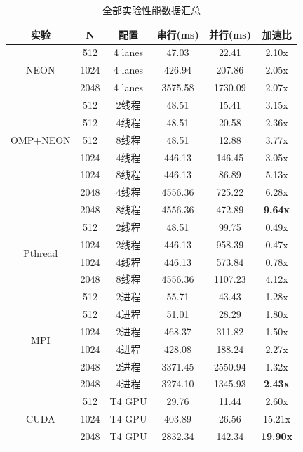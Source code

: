 \documentclass[a4paper]{article}
\begin{document}
\begin{table}[H]
  \centering
  \caption{全部实验性能数据汇总}
  \label{table:allperf}
  \small
  \begin{tabular}{|c|c|c|c|c|c|}
  \hline
  \textbf{实验} & \textbf{N} & \textbf{配置} & \textbf{串行(ms)} & \textbf{并行(ms)} & \textbf{加速比} \\
  \hline
  \multirow{3}{*}{NEON} & 512 & 4 lanes & 47.03 & 22.41 & 2.10x \\
   & 1024 & 4 lanes & 426.94 & 207.86 & 2.05x \\
   & 2048 & 4 lanes & 3575.58 & 1730.09 & 2.07x \\
  \hline
  \multirow{5}{*}{OMP+NEON} & 512 & 2线程 & 48.51 & 15.41 & 3.15x \\
   & 512 & 4线程 & 48.51 & 20.58 & 2.36x \\
   & 512 & 8线程 & 48.51 & 12.88 & 3.77x \\
   & 1024 & 4线程 & 446.13 & 146.45 & 3.05x \\
   & 1024 & 8线程 & 446.13 & 86.89 & 5.13x \\
   & 2048 & 4线程 & 4556.36 & 725.22 & 6.28x \\
   & 2048 & 8线程 & 4556.36 & 472.89 & \textbf{9.64x} \\
  \hline
  \multirow{4}{*}{Pthread} & 512 & 2线程 & 48.51 & 99.75 & 0.49x \\
   & 1024 & 2线程 & 446.13 & 958.39 & 0.47x \\
   & 1024 & 4线程 & 446.13 & 573.84 & 0.78x \\
   & 2048 & 8线程 & 4556.36 & 1107.23 & 4.12x \\
  \hline
  \multirow{6}{*}{MPI} & 512 & 2进程 & 55.71 & 43.43 & 1.28x \\
   & 512 & 4进程 & 51.01 & 28.29 & 1.80x \\
   & 1024 & 2进程 & 468.37 & 311.82 & 1.50x \\
   & 1024 & 4进程 & 428.08 & 188.24 & 2.27x \\
   & 2048 & 2进程 & 3371.45 & 2550.94 & 1.32x \\
   & 2048 & 4进程 & 3274.10 & 1345.93 & \textbf{2.43x} \\
  \hline
  \multirow{3}{*}{CUDA} & 512 & T4 GPU & 29.76 & 11.44 & 2.60x \\
   & 1024 & T4 GPU & 403.89 & 26.56 & 15.21x \\
   & 2048 & T4 GPU & 2832.34 & 142.34 & \textbf{19.90x} \\
  \hline
  \end{tabular}
\end{table}
\end{document}
